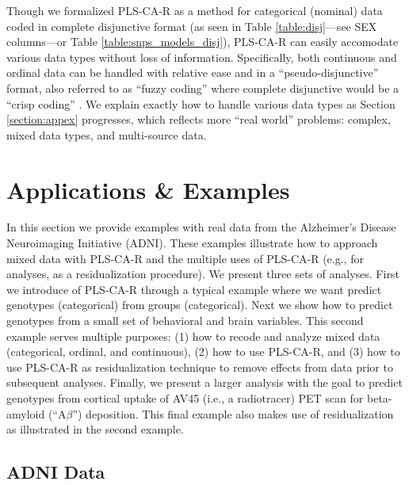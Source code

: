 \documentclass[12pt]{article}
\begin{document}
Though we formalized PLS-CA-R as a method for categorical (nominal) data
coded in complete disjunctive format (as seen in Table
\ref{table:disj}---see SEX columns---or Table
\ref{table:snps_models_disj}), PLS-CA-R can easily accomodate various
data types without loss of information. Specifically, both continuous
and ordinal data can be handled with relative ease and in a
``pseudo-disjunctive'' format, also referred to as ``fuzzy coding''
where complete disjunctive would be a ``crisp coding''
\citep{greenacrefuzzy}. We explain exactly how to handle various data
types as Section \ref{section:appex} progresses, which reflects more
``real world'' problems: complex, mixed data types, and multi-source
data.

\hypertarget{applications-examples}{%
\section{Applications \& Examples}\label{applications-examples}}

\label{section:appex}

In this section we provide examples with real data from the Alzheimer's
Disease Neuroimaging Initiative (ADNI). These examples illustrate how to
approach mixed data with PLS-CA-R and the multiple uses of PLS-CA-R
(e.g., for analyses, as a residualization procedure). We present three
sets of analyses. First we introduce of PLS-CA-R through a typical
example where we want predict genotypes (categorical) from groups
(categorical). Next we show how to predict genotypes from a small set of
behavioral and brain variables. This second example serves multiple
purposes: (1) how to recode and analyze mixed data (categorical,
ordinal, and continuous), (2) how to use PLS-CA-R, and (3) how to use
PLS-CA-R as residualization technique to remove effects from data prior
to subsequent analyses. Finally, we present a larger analysis with the
goal to predict genotypes from cortical uptake of AV45 (i.e., a
radiotracer) PET scan for beta-amyloid (``A\(\beta\)'') deposition. This
final example also makes use of residualization as illustrated in the
second example.

\hypertarget{adni-data}{%
\subsection{ADNI Data}\label{adni-data}}

\label{section:data}
\end{document}
